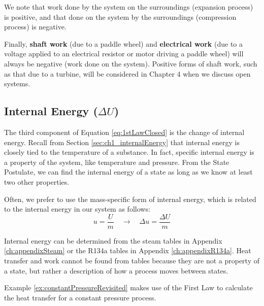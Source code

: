 We note that work done by the system on the surroundings (expansion process) is positive, and that done on the system by the surroundings (compression process) is negative.

Finally, {\bf shaft work} (due to a paddle wheel) and {\bf electrical work} (due to a voltage applied to an electrical resistor or motor driving a paddle wheel) will always be negative (work done on the system). Positive forms of shaft work, such as that due to a turbine, will be considered in Chapter 4 when we discuss open systems.


\subsection{Internal Energy ($\Delta U$)}

The third component of Equation \ref{eq:1stLawClosed} is the change of internal energy. Recall from Section \ref{sec:ch1_internalEnergy} that internal energy is closely tied to the temperature of a substance.  In fact, specific internal energy is a property of the system, like temperature and pressure.  From the State Postulate, we can find the internal energy of a state as long as we know at least two other properties.

Often, we prefer to use the mass-specific form of internal energy, which is related to the internal energy in our system as follows:
\begin{equation*}
  u = \frac{U}{m} \quad \rightarrow \quad \Delta u = \frac{\Delta U}{m}
\end{equation*}

Internal energy can be determined from the steam tables in Appendix \ref{ch:appendixSteam} or the R134a tables in Appendix \ref{ch:appendixR134a}.
Heat transfer and work cannot be found from tables because they are not a property of a state, but rather a description of how a process moves between states.

Example \ref{ex:constantPressureRevisited} makes use of the First Law to calculate the heat transfer for a constant pressure process.

